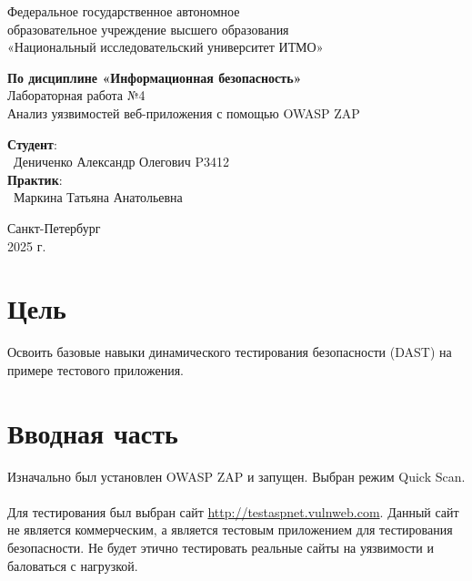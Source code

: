 \documentclass{article}
\begin{document}
\begin{center}
    \Large
    Федеральное государственное автономное \\
    образовательное учреждение высшего образования \\ 
    «Национальный исследовательский университет ИТМО»\\
    \vspace{0.5cm}
    \large
    
    \vspace{1cm}
    \Large
    \textbf{По дисциплине «Информационная безопасность»} \\
        Лабораторная работа №4\\
        Анализ уязвимостей веб-приложения с
помощью OWASP ZAP
    \large
    \vspace{8cm}

    \begin{minipage}{.33\textwidth}
    \end{minipage}
    \hfill
    \begin{minipage}{.4\textwidth}
    
        \textbf{Студент}: \vspace{.1cm} \\
        \ Дениченко Александр Олегович P3412\\
        \textbf{Практик}:  \\
        \ Маркина Татьяна Анатольевна
    \end{minipage}
    \vfill
Санкт-Петербург\\ 2025 г.
\end{center}
\pagestyle{empty}
\newpage
\pagestyle{plain}

\section*{Цель}

Освоить базовые навыки динамического тестирования безопасности (DAST) на
примере тестового приложения.

\section{Вводная часть}

Изначально был установлен OWASP ZAP и запущен. Выбран режим Quick Scan.
\\ \\
Для тестирования был выбран сайт \href{http://testaspnet.vulnweb.com}{http://testaspnet.vulnweb.com}. Данный сайт не является коммерческим, а является тестовым приложением для тестирования безопасности.
Не будет этично тестировать реальные сайты на уязвимости и баловаться с нагрузкой.
\end{document}
